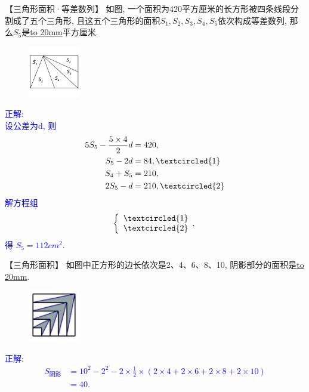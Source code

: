 \item {
    【三角形面积·等差数列】
    如图, 一个面积为420平方厘米的长方形被四条线段分割成了五个三角形, 且这五个三角形的面积$S_1, S_2, S_3, S_4, S_5$依次构成等差数列, 那么$S_5$是\underline{\hbox to 20mm{}}平方厘米.
    \begin{figure}[H] 
        \centering
        \includegraphics[width=0.2\textwidth]{./pics/Chapter_2/16.png}
    \end{figure}
    \ifshowSolution 
        \fangsong{}\textcolor{blue}{
            正解: \\
            设公差为d, 则 
            \begin{align*}
                5S_{5} - \frac{5\times 4}{2}d &= 420, \\
                S_{5} - 2d &= 84, \textcircled{1} \\
                S_{4} + S_{5} &= 210, \\
                2S_{5} - d &= 210, \textcircled{2} \\
            \end{align*}
            解方程组
            \[\left\{
                \begin{array}{l}
                    \textcircled{1} \\ 
                    \textcircled{2} 
                \end{array},
            \right.\]
            得 $S_{5}=112  {cm}^2.$
        }
    \else
        \vspace{1cm}
    \fi
}

\item {
    【三角形面积】
    如图中正方形的边长依次是2、4、6、8、10, 阴影部分的面积是\underline{\hbox to 20mm{}}.
    \begin{figure}[H] 
        \centering
        \includegraphics[width=0.2\textwidth]{./pics/Chapter_2/17.png}
    \end{figure}
    \ifshowSolution 
        \fangsong{}\textcolor{blue}{
            正解: \\
            \begin{align*}
                S_{阴影} &= 10^2 - 2^2 - 2\times \frac12\times (2\times 4 + 2\times 6 + 2\times 8 + 2\times 10) \\
                &= 40.
            \end{align*}
        }
    \else
        \vspace{1cm}
    \fi
}

